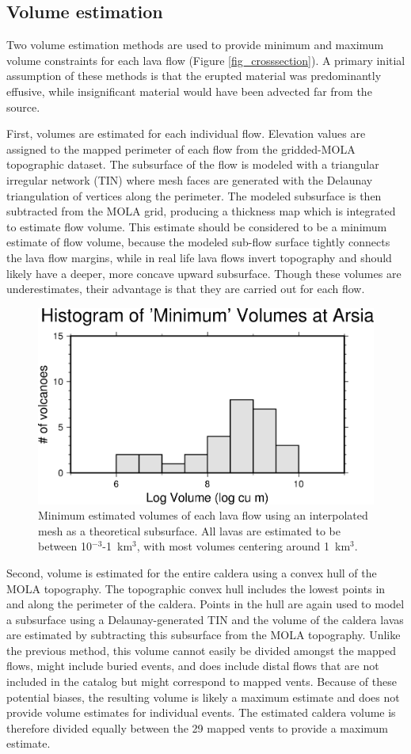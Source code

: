 \documentclass[12pt,letter]{article}
\begin{document}
\subsection{Volume estimation}\label{sec_volume}
Two volume estimation methods are used to provide minimum and maximum volume constraints for each lava flow (Figure \ref{fig_crosssection}). A primary initial assumption of these methods is that the erupted material was predominantly effusive, while insignificant material would have been advected far from the source.

First, volumes are estimated for each individual flow. Elevation values are assigned to the mapped perimeter of each flow from the gridded-MOLA topographic dataset. The subsurface of the flow is modeled with a triangular irregular network (TIN) where mesh faces are generated with the Delaunay triangulation of vertices along the perimeter. The modeled subsurface is then subtracted from the MOLA grid, producing a thickness map which is integrated to estimate flow volume. This estimate should be considered to be a minimum estimate of flow volume, because the modeled sub-flow surface tightly connects the lava flow margins, while in real life lava flows invert topography and should likely have a deeper, more concave upward subsurface. Though these volumes are underestimates, their advantage is that they are carried out for each flow.


\begin{figure}
\centering
\includegraphics[width=0.4\linewidth]{figures/volumehist.png}
\caption{Minimum estimated volumes of each lava flow using an interpolated mesh as a theoretical subsurface. All lavas are estimated to be between 10$^{-3}$-1~km$^3$, with most volumes centering around 1~km$^3$.}
\label{fig_volumehistogram}
\end{figure}

Second, volume is estimated for the entire caldera using a convex hull of the MOLA topography. The topographic convex hull includes the lowest points in and along the perimeter of the caldera. Points in the hull are again used to model a subsurface using a Delaunay-generated TIN and the volume of the caldera lavas are estimated by subtracting this subsurface from the MOLA topography. Unlike the previous method, this volume cannot easily be divided amongst the mapped flows, might include buried events, and does include distal flows that are not included in the catalog but might correspond to mapped vents. Because of these potential biases, the resulting volume is likely a maximum estimate and does not provide volume estimates for individual events. The estimated caldera volume is therefore divided equally between the 29 mapped vents to provide a maximum estimate.
\end{document}
